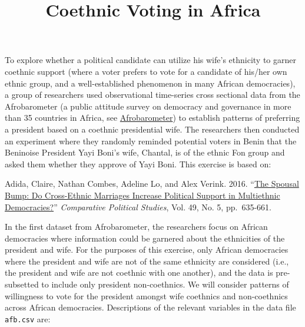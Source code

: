 \documentclass[]{article}
\title{Coethnic Voting in Africa}
\author{}
\date{}
\begin{document}
\maketitle


To explore whether a political candidate can utilize his wife's
ethnicity to garner coethnic support (where a voter prefers to vote for
a candidate of his/her own ethnic group, and a well-established
phenomenon in many African democracies), a group of researchers used
observational time-series cross sectional data from the Afrobarometer (a
public attitude survey on democracy and governance in more than 35
countries in Africa, see
\href{http://www.afrobarometer.org/}{Afrobarometer}) to establish
patterns of preferring a president based on a coethnic presidential
wife. The researchers then conducted an experiment where they randomly
reminded potential voters in Benin that the Beninoise President Yayi
Boni's wife, Chantal, is of the ethnic Fon group and asked them whether
they approve of Yayi Boni. This exercise is based on:

Adida, Claire, Nathan Combes, Adeline Lo, and Alex Verink. 2016.
``\href{http://dx.doi.org/10.1177/0010414015621080}{The Spousal Bump: Do
Cross-Ethnic Marriages Increase Political Support in Multiethnic
Democracies?}'' \emph{Comparative Political Studies}, Vol. 49, No. 5,
pp.~635-661.

In the first dataset from Afrobarometer, the researchers focus on
African democracies where information could be garnered about the
ethnicities of the president and wife. For the purposes of this
exercise, only African democracies where the president and wife are not
of the same ethnicity are considered (i.e., the president and wife are
not coethnic with one another), and the data is pre-subsetted to include
only president non-coethnics. We will consider patterns of willingness
to vote for the president amongst wife coethnics and non-coethnics
across African democracies. Descriptions of the relevant variables in
the data file \texttt{afb.csv} are:
\end{document}
